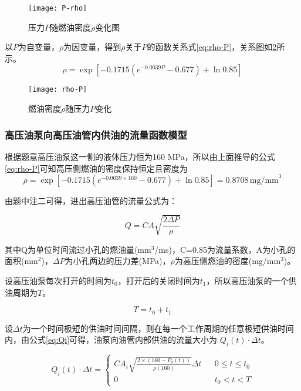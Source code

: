 \documentclass[withoutpreface,bwprint]{cumcmthesis} %
\begin{document}
\begin{figure}[!h]
	\centering
	\texttt{[image: P-rho]}
	\caption{压力$P$随燃油密度$\rho$变化图}
	\label{fig:P-rho}
\end{figure}


以$P$为自变量，$\rho$为因变量，得到$\rho$关于$P$的函数关系式\cref{eq:rho-P}，关系图如\cref{fig:rho-P}所示。
\begin{equation}
\rho=\exp \left[-0.1715\left(e^{-0.0039P}-0.677\right)+\ln 0.85 \right]
\label{eq:rho-P}
\end{equation}

\clearpage

\begin{figure}[!h]
	\centering
	\texttt{[image: rho-P]}
	\caption{燃油密度$\rho$随压力$P$变化}
	\label{fig:rho-P}
\end{figure}



\subsubsection{高压油泵向高压油管内供油的流量函数模型}

根据题意高压油泵这一侧的液体压力恒为160 MPa，所以由上面推导的公式\cref{eq:rho-P}可知高压侧燃油的密度保持恒定且密度为
\[
\rho=\exp\left [-0.1715\left (e^{-0.0039\times160}-0.677 \right )+\ln 0.85\right ]=0.8708\,\text{mg/mm}^{3}
\]

由题中注二可得，进出高压油管的流量公式为：

\begin{equation}
Q=CA\sqrt{\frac{2 \Delta P}{\rho}}
\end{equation}

其中Q为单位时间流过小孔的燃油量(mm$^3$/ms)，C=0.85为流量系数，A为小孔的面积(mm$^2$)，$\Delta P$为小孔两边的压力差(MPa)，$\rho$为高压侧燃油的密度(mg/mm$^3$)。


设高压油泵每次打开的时间为$t_0$，打开后的关闭时间为$t_1$，所以高压油泵的一个供油周期为$T$。

 \begin{equation}
T=t_0+t_1
\label{eq:energy}
\end{equation}

设$\Delta t$为一个时间极短的供油时间间隔，则在每一个工作周期的任意极短供油时间内，由公式\cref{eq:Qi}可得，油泵向油管内部供油的流量大小为 $Q_{i}(t)\cdot \Delta t$。

\begin{equation}\label{eq:Qi}
Q_i(t)\cdot \Delta t =\left\{
\begin{array}{lcr}
    CA_{i}\sqrt{\frac{2\times(160-P_a(t))}{\rho(160)}} \Delta t & & { 0\le t\le t_0}\\
	0 & & {t_0<t<T}
\end{array} \right.
\end{equation}
\end{document}
